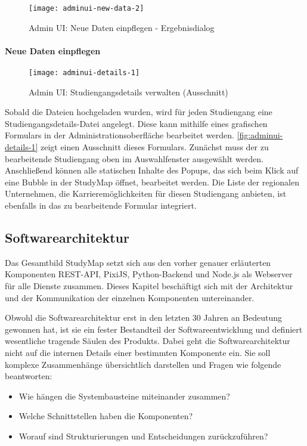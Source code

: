 \begin{figure}[H]
    \centering
    \texttt{[image: adminui-new-data-2]}
    \caption{Admin UI: Neue Daten einpflegen - Ergebnisdialog}
    \label{fig:adminui-new-data-2}
\end{figure}

\paragraph*{Neue Daten einpflegen}
\begin{figure}[H]
    \centering
    \texttt{[image: adminui-details-1]}
    \caption{Admin UI: Studiengangsdetails verwalten (Ausschnitt)}
    \label{fig:adminui-details-1}
\end{figure}

Sobald die Dateien hochgeladen wurden, wird für jeden Studiengang eine Studiengangsdetails-Datei angelegt. Diese kann mithilfe eines grafischen Formulars in der Administrationsoberfläche bearbeitet werden. \autoref{fig:adminui-details-1} zeigt einen Ausschnitt dieses Formulars. Zunächst muss der zu bearbeitende Studiengang oben im Auswahlfenster ausgewählt werden. Anschließend können alle statischen Inhalte des Popups, das sich beim Klick auf eine Bubble in der StudyMap öffnet, bearbeitet werden. Die Liste der regionalen Unternehmen, die Karrieremöglichkeiten für diesen Studiengang anbieten, ist ebenfalls in das zu bearbeitende Formular integriert.

\newpage
\subsection{Softwarearchitektur}
Das Gesamtbild StudyMap setzt sich aus den vorher genauer erläuterten Komponenten REST-API, PixiJS, Python-Backend und Node.js als Webserver für alle Dienste zusammen. Dieses Kapitel beschäftigt sich mit der Architektur und der Kommunikation der einzelnen Komponenten untereinander.

Obwohl die Softwarearchitektur erst in den letzten 30 Jahren an Bedeutung gewonnen hat, ist sie ein fester Bestandteil der Softwareentwicklung und definiert wesentliche tragende Säulen des Produkts. Dabei geht die Softwarearchitektur nicht auf die internen Details einer bestimmten Komponente ein. \parencite{vogel_einleitung_2009} Sie soll komplexe Zusammenhänge übersichtlich darstellen und Fragen wie folgende beantworten:
\begin{itemize}
    \item Wie hängen die Systembausteine miteinander zusammen?
    \item Welche Schnittstellen haben die Komponenten?
    \item Worauf sind Strukturierungen und Entscheidungen zurückzuführen?
\end{itemize}

